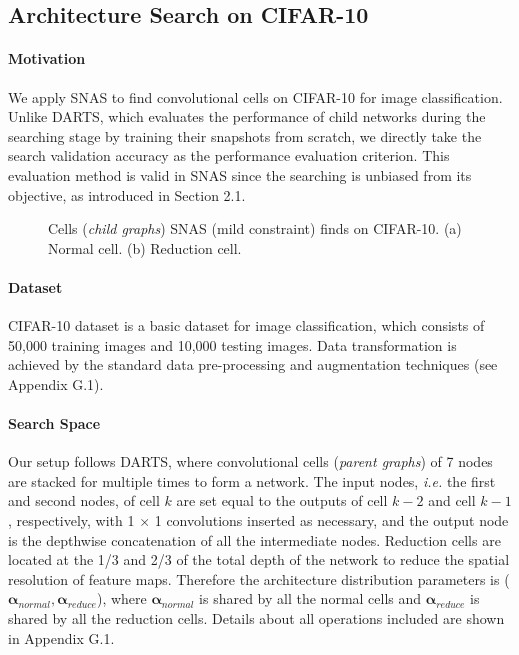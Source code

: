 \documentclass{article} \usepackage{iclr2019_conference,times}
\begin{document}
\subsection{Architecture Search on CIFAR-10}

\paragraph{Motivation}

We apply SNAS to find convolutional cells on CIFAR-10 for image classification. Unlike DARTS, which evaluates the performance of child networks during the searching stage by training their snapshots from scratch, we directly take the search validation accuracy as the performance evaluation criterion. This evaluation method is valid in SNAS since the searching is unbiased from its objective, as introduced in Section 2.1. 

\begin{figure}[h]
  \centering
  \caption{Cells (\textit{child graphs}) SNAS (mild constraint) finds on CIFAR-10. (a) Normal cell. (b) Reduction cell.}
  \label{fig:normal_reduction}
\end{figure}

\paragraph{Dataset}

CIFAR-10 dataset \citep{krizhevsky2009learning} is a basic dataset for image classification, which consists of 50,000 training images and 10,000 testing images. Data transformation is achieved by the standard data pre-processing and augmentation techniques (see Appendix G.1).

\paragraph{Search Space}

Our setup follows DARTS, where convolutional cells (\textit{parent graphs}) of 7 nodes are stacked for multiple times to form a network. The input nodes, \textit{i.e.} the first and second nodes, of cell $k$ are set equal to the outputs of cell $k-2$ and cell $k-1$, respectively, with 1 $\times$ 1 convolutions inserted as necessary, and the output node is the depthwise concatenation of all the intermediate nodes. Reduction cells are located at the 1/3 and 2/3 of the total depth of the network to reduce the spatial resolution of feature maps. Therefore the architecture distribution parameters is ($\bm{\alpha}_{normal}, \bm{\alpha}_{reduce}$), where $\bm{\alpha}_{normal}$ is shared by all the normal cells and $\bm{\alpha}_{reduce}$ is shared by all the reduction cells. Details about all operations included are shown in Appendix G.1.
\end{document}
